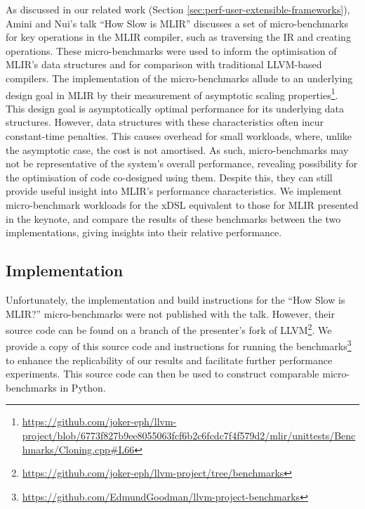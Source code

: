 As discussed in our related work (Section \ref{sec:perf-user-extensible-frameworks}), Amini and Nui's talk ``How Slow is MLIR'' \cite{aminiHowSlowMLIR2024} discusses a set of micro-benchmarks for key operations in the MLIR compiler, such as traversing the IR and creating operations.
These micro-benchmarks were used to inform the optimisation of MLIR's data structures and for comparison with traditional LLVM-based compilers. The implementation of the micro-benchmarks allude to an underlying design goal in MLIR by their measurement of asymptotic scaling properties\footnote{\url{https://github.com/joker-eph/llvm-project/blob/6773f827b9ee8055063fcf6b2c6fcdc7f4f579d2/mlir/unittests/Benchmarks/Cloning.cpp\#L66}}. This design goal is asymptotically optimal performance for its underlying data structures. However, data structures with these characteristics often incur constant-time penalties.
This causes overhead for small workloads, where, unlike the asymptotic case, the cost is not amortised. As such, micro-benchmarks may not be representative of the system's overall performance, revealing possibility for the optimisation of code co-designed using them.
Despite this, they can still provide useful insight into MLIR's performance characteristics.
We implement micro-benchmark workloads for the xDSL equivalent to those for MLIR presented in the keynote, and compare the results of these benchmarks between the two implementations, giving insights into their relative performance.

\subsection{Implementation}
\label{ssec:ubenchmark-implementation}

Unfortunately, the implementation and build instructions for the ``How Slow is MLIR?'' micro-benchmarks were not published with the talk.
However, their source code can be found on a branch of the presenter's fork of LLVM\footnote{\url{https://github.com/joker-eph/llvm-project/tree/benchmarks}}. We provide a copy of this source code and instructions for running the benchmarks\footnote{\url{https://github.com/EdmundGoodman/llvm-project-benchmarks}} to enhance the replicability of our results and facilitate further performance experiments.
This source code can then be used to construct comparable micro-benchmarks in Python.


